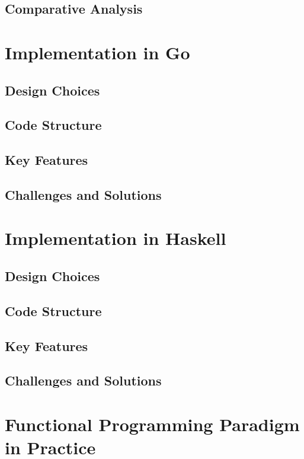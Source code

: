     \section{Comparative Analysis}\label{sec:comparative-analysis}

\chapter{Implementation in Go}\label{chap:implementation-go}
    \section{Design Choices}\label{sec:design-go}
    \section{Code Structure}\label{sec:code-structure-go}
    \section{Key Features}\label{sec:key-features-go}
    \section{Challenges and Solutions}\label{sec:challenges-go}

\chapter{Implementation in Haskell}\label{chap:implementation-haskell}
    \section{Design Choices}\label{sec:design-haskell}
    \section{Code Structure}\label{sec:code-structure-haskell}
    \section{Key Features}\label{sec:key-features-haskell}
    \section{Challenges and Solutions}\label{sec:challenges-haskell}

\chapter{Functional Programming Paradigm in Practice}\label{chap:fp-paradigm}
